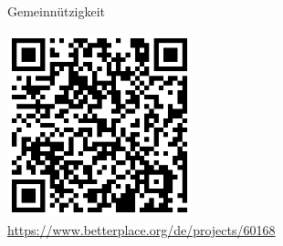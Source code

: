 \documentclass[12pt,hyperref={pdfpagelabels=false},notes=show,aspectratio=169]{beamer}
\begin{document}
\section*{}
\begin{frame}{Gemeinnützigkeit}
    \begin{center}
        \includegraphics[width=0.4\textwidth]{img/betterplace}\\\vspace{-0.2cm}
        \url{https://www.betterplace.org/de/projects/60168}
     \end{center}
\end{frame}\addtocounter{framenumber}{-1}
	
\end{document}
